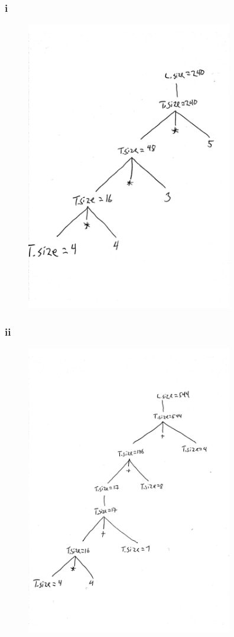 \documentclass[paper=a4, fontsize=11pt]{scrartcl} %
\numberwithin{equation}{section} %
\numberwithin{figure}{section} %
\numberwithin{table}{section} %
\begin{document}
\subsubsection{i}

\begin{figure}[ht!]
\centering
\includegraphics[width=90mm]{task_b_i.pdf}
\end{figure}

\newpage
\subsubsection{ii}
\begin{figure}[ht!]
\centering
\includegraphics[width=90mm]{task_b_ii.pdf}
\end{figure}


\end{document}
